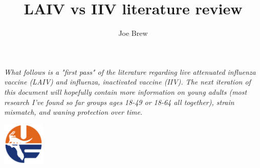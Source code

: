 \documentclass[11pt]{article}
\begin{document}


\title{\textbf{LAIV vs IIV literature review}}
\author{Joe Brew}


\maketitle

\emph{What follows is a "first pass" of the literature regarding live attenuated influenza vaccine (LAIV) and influenza, inactivated vaccine (IIV).  The next iteration of this document will hopefully contain more information on young adults (most research I've found so far groups ages 18-49 or 18-64 all together), strain mismatch, and waning protection over time.}
\tableofcontents

\vspace{20mm}

\begin{center}
\includegraphics[width=2cm]{uf}
\end{center}


\end{document}
